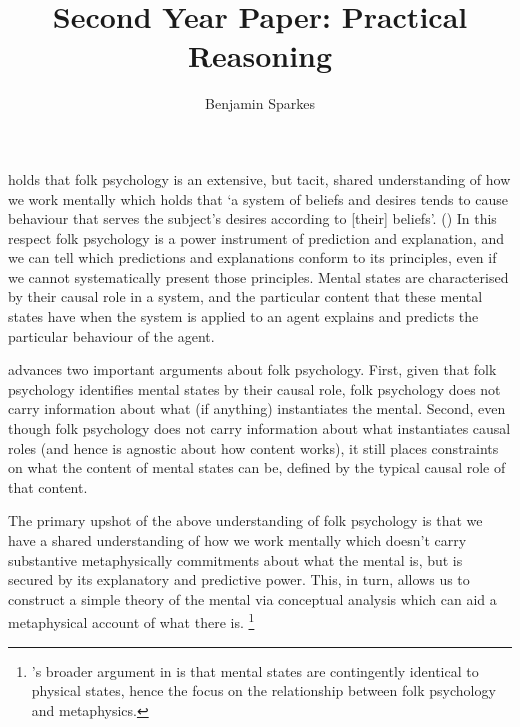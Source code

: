 \documentclass[10pt]{article}
\title{Second Year Paper: Practical Reasoning}
\author{Benjamin Sparkes}
\begin{document}
\citeauthor{Lewis:1999ab} holds that folk psychology is an extensive, but tacit, shared understanding of how we work mentally which holds that `a system of beliefs and desires tends to cause behaviour that serves the subject's desires according to [their] beliefs'. (\citeyear[320]{Lewis:1999ab})
In this respect folk psychology is a power instrument of prediction and explanation, and we can tell which predictions and explanations conform to its principles, even if we cannot systematically present those principles.
Mental states are characterised by their causal role in a system, and the particular content that these mental states have when the system is applied to an agent explains and predicts the particular behaviour of the agent.

\citeauthor{Lewis:1999ab} advances two important arguments about folk psychology.
First, given that folk psychology identifies mental states by their causal role, folk psychology does not carry information about what (if anything) instantiates the mental.
Second, even though folk psychology does not carry information about what instantiates causal roles (and hence is agnostic about how content works), it still places constraints on what the content of mental states can be, defined by the typical causal role of that content.

The primary upshot of the above understanding of folk psychology is that we have a shared understanding of how we work mentally which doesn't carry substantive metaphysically commitments about what the mental is, but is secured by its explanatory and predictive power.
This, in turn, allows us to construct a simple theory of the mental via conceptual analysis which can aid a metaphysical account of what there is.\nolinebreak
\footnote{\citeauthor{Lewis:1999ab}'s broader argument in  is that mental states are contingently identical to physical states, hence the focus on the relationship between folk psychology and metaphysics.}
\end{document}
